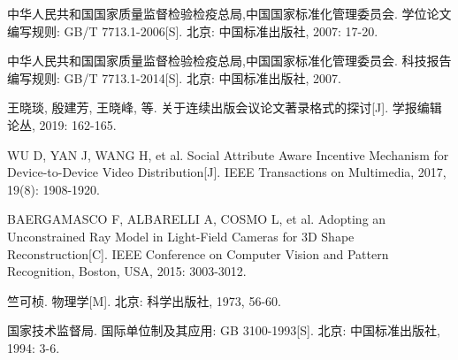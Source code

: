 \begin{thebibliography}{1}
\wuhao %
\setlength{\itemsep}{-1.5ex} %
\thispagestyle{others}

中华人民共和国国家质量监督检验检疫总局,中国国家标准化管理委员会. 学位论文编写规则: GB/T 7713.1-2006[S]. 北京: 中国标准出版社, 2007: 17-20.


中华人民共和国国家质量监督检验检疫总局,中国国家标准化管理委员会. 科技报告编写规则: GB/T 7713.1-2014[S]. 北京: 中国标准出版社, 2007.

王晓琰, 殷建芳, 王晓峰, 等. 关于连续出版会议论文著录格式的探讨[J]. 学报编辑论丛, 2019: 162-165.

WU D, YAN J, WANG H, et al. Social Attribute Aware Incentive Mechanism for Device-to-Device Video Distribution[J]. IEEE Transactions on Multimedia, 2017, 19(8): 1908-1920.

BAERGAMASCO F, ALBARELLI A, COSMO L, et al. Adopting an Unconstrained Ray Model in Light-Field Cameras for 3D Shape Reconstruction[C]. IEEE Conference on Computer Vision and Pattern Recognition, Boston, USA, 2015: 3003-3012.

竺可桢. 物理学[M]. 北京: 科学出版社, 1973, 56-60.

国家技术监督局. 国际单位制及其应用: GB 3100-1993[S]. 北京: 中国标准出版社, 1994: 3-6.
\end{thebibliography}

%
%
%
%
%





\clearpage